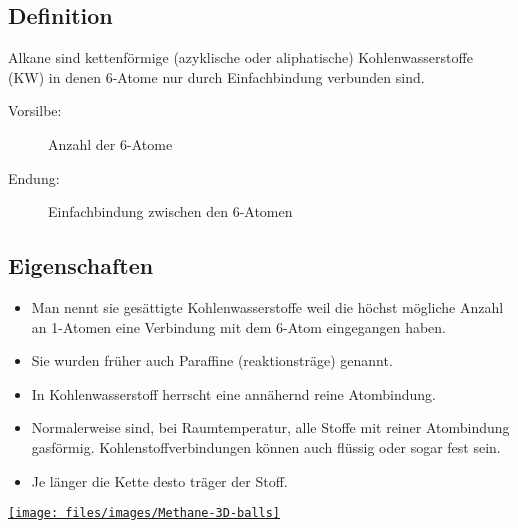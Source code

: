 

\subsection{Definition}
\label{sec:Alkane:Definition}
Alkane sind kettenförmige (azyklische oder aliphatische) Kohlenwasserstoffe (KW) in denen
\ac{6}-Atome nur durch Einfachbindung verbunden sind.

\begin{description}
	\item[Vorsilbe:] Anzahl der \ac{6}-Atome
	\item[Endung:] Einfachbindung zwischen den \ac{6}-Atomen
\end{description}

\subsection{Eigenschaften}
\begin{itemize}
	\item Man nennt sie gesättigte Kohlenwasserstoffe weil die höchst mögliche Anzahl an
		\ac{1}-Atomen eine Verbindung mit dem \ac{6}-Atom eingegangen haben.
	\item Sie wurden früher auch Paraffine (reaktionsträge) genannt.
	\item In Kohlenwasserstoff herrscht eine annähernd reine Atombindung.
	\item Normalerweise sind, bei Raumtemperatur, alle Stoffe mit reiner Atombindung
		gasförmig. Kohlenstoffverbindungen können auch flüssig oder sogar fest sein.
	\item Je länger die Kette desto träger der Stoff.
\end{itemize}

\begin{center}
\end{center}

\begin{figurewrapper}
	\href{http://en.wikipedia.org/wiki/File:Methane-3D-balls.png}
	{\texttt{[image: files/images/Methane-3D-balls]}}
\end{figurewrapper}

